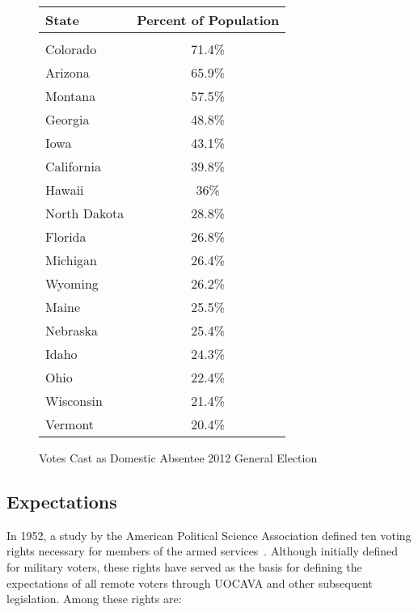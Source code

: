 
\begin{figure}
\begin{center}
\begin{tabular}{l c}
{\bf State} & {\bf Percent of Population}\\\hline\\
Colorado & 71.4\%\\
Arizona & 65.9\%\\
Montana & 57.5\%\\
Georgia & 48.8\%\\
Iowa & 43.1\%\\
California & 39.8\%\\
Hawaii & 36\%\\
North Dakota & 28.8\%\\
Florida & 26.8\%\\
Michigan & 26.4\%\\
Wyoming & 26.2\%\\
Maine & 25.5\%\\
Nebraska & 25.4\%\\
Idaho & 24.3\%\\
Ohio & 22.4\%\\
Wisconsin & 21.4\%\\
Vermont & 20.4\%\\
\end{tabular}
\end{center}
\caption{Votes Cast as Domestic Absentee 2012 General Election}
\label{fig:domestic_populations}
\end{figure}

\subsection{Expectations}

In 1952, a study by the American Political Science Association defined
ten voting rights necessary for members of the armed
services~\cite{american1952findings}. Although initially defined for
military voters, these rights have served as the basis for defining
the expectations of all remote voters through UOCAVA and other
subsequent legislation. Among these rights are:

